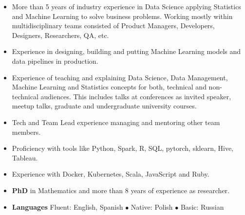 \documentclass[a4paper, oneside]{scrreprt}
\begin{document}
\begin{itemize}
\item More than 5 years of industry experience in Data Science applying Statistics and Machine
  Learning to solve business problems. Working mostly within multidisciplinary teams consisted of
  Product Managers, Developers, Designers, Researchers, QA, etc.
\item Experience in designing, building and putting  Machine Learning models and data
  pipelines in production.
\item Experience of teaching and explaining Data Science, Data Management, Machine Learning and
  Statistics concepts for both, technical and non-technical audiences. This includes talks at
  conferences as invited speaker, meetup talks, graduate and undergraduate university courses.
\item Tech and Team Lead experience managing and mentoring other team members.
\item Proficiency with tools like Python, Spark, R, SQL, pytorch, sklearn, Hive, Tableau.
\item Experience with Docker, Kubernetes, Scala, JavaScript and Ruby. 
\item \textbf{PhD} in Mathematics and more than 8 years of experience as researcher. 
\item \textbf{Languages} Fluent: English, Spanish $\bullet$ Native: Polish  $\bullet$ Basic: Russian 
\end{itemize}

\noindent\makebox[\linewidth]{\rule{\textwidth}{0.4pt}}

\end{document}

